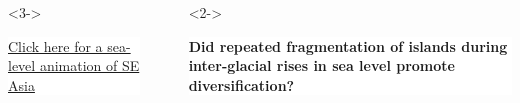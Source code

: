 {
\begin{frame}
    \begin{columns}

        \vspace{6.5cm}

        \begin{uncoverenv}<3->
        \colorbox{white}{
            \begin{minipage}[t]{0.6\textwidth}
                \raggedright
                \href{https://youtu.be/mLNLRdbu5W8}{Click here for a sea-level animation of SE Asia}
            \end{minipage}
        }
        \end{uncoverenv}

        \ \\


        \vspace{-2cm}

        \begin{uncoverenv}<2->
        \colorbox{white}{
            \begin{minipage}[t]{1.0\textwidth}
                \raggedright
                \textbf{Did repeated fragmentation of islands during
                    inter-glacial rises in sea level promote diversification?}
            \end{minipage}
        }
        \end{uncoverenv}
    \end{columns}
\end{frame}
}

